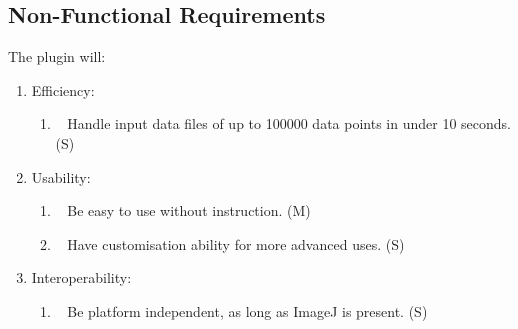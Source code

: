 \subsection{Non-Functional Requirements}
\label{sub:non_functional_requirements}

The plugin will:

\begin{enumerate}[label=\arabic*.]
	\item Efficiency:
		\begin{enumerate}[label*=\arabic*.]
			\item~\label{req:o} Handle input data files of up to \num{100000}
				data points in under 10 seconds. (S)
		\end{enumerate}
	\item Usability:
		\begin{enumerate}[label*=\arabic*.]
			\item~\label{req:p} Be easy to use without instruction. (M)
			\item~\label{req:q} Have customisation ability for more advanced
				uses. (S)
		\end{enumerate}
	\item Interoperability:
		\begin{enumerate}[label*=\arabic*.]
			\item~\label{req:r} Be platform independent, as long as ImageJ is
				present. (S)
		\end{enumerate}
\end{enumerate}

\restoregeometry%
